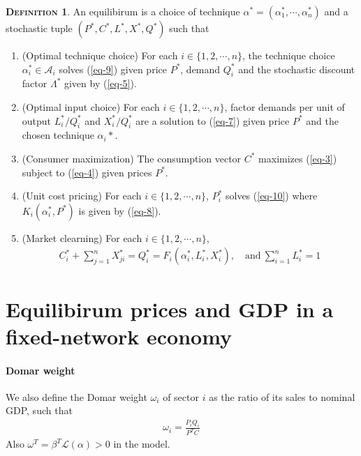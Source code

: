 \documentclass[11pt]{article}
\theoremstyle{definition}
\newtheorem{define}{\noindent \textbf{\textsc{Definition}}}
\begin{document}
	\begin{define}
		An equilibirum is a choice of technique $\alpha^* = (\alpha_1^*,\cdots, \alpha_n^*)$ and a stochastic tuple $(P^*, C^*, L^*, X^*, Q^*)$ such that
		\begin{enumerate}[leftmargin=1cm, label=\arabic*.]
			\item (Optimal technique choice) For each $i\in\{1,2,\cdots,n\}$, the technique choice $\alpha_i^*\in\mathcal{A}_i$ solves (\ref{eq-9}) given price $P^*$, demand $Q^*_i$ and the stochastic discount factor $\Lambda^*$ given by (\ref{eq-5}).
			\item (Optimal input choice) For each $i\in\{1,2,\cdots,n\}$, factor demands per unit of output $L_i^*/Q_i^*$ and $X_i^*/Q_i^*$ are a solution to (\ref{eq-7}) given price $P^*$ and the chosen technique $\alpha_i*$.
			\item (Consumer maximization) The consumption vector $C^*$ maximizes (\ref{eq-3}) subject to (\ref{eq-4}) given prices $P^*$.
			\item (Unit cost pricing) For each $i\in\{1,2,\cdots,n\}$, $P^*_i$ solves (\ref{eq-10}) where $K_i(\alpha_i^*, P^*)$ is given by (\ref{eq-8}).
			\item (Market clearning) For each $i\in\{1,2,\cdots,n\}$,
			\begin{align}
				C_i^* + \sum\limits_{j=1}^n X_{ji}^* = Q_i^* = F_i(\alpha_i^*, L_i^*, X_i^*), \quad \text{and} \ \sum\limits_{i=1}^n L_i^* = 1 \label{eq-11}
			\end{align}
		\end{enumerate}
	\end{define}
	
	
	\section{Equilibirum prices and GDP in a fixed-network economy}
	\paragraph{Domar weight} 
	We also define the Domar weight $\omega_i$ of sector $i$ as the ratio of its sales to nominal GDP, such that
	\begin{align*}
		\omega_i = \frac{P_iQ_i}{P^TC}
	\end{align*}
	Also $\omega^T = \beta^T \mathcal{L}(\alpha) > 0$ in the model.
	
\end{document}
